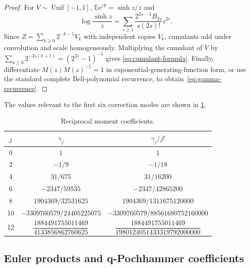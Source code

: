 \documentclass[11pt,a4paper]{article}
\theoremstyle{remark}
\newcommand{\e}{\mathrm{e}}
\begin{document}
\begin{proof}
For $V\sim\operatorname{Unif}[-1,1]$,
$\mathbb E\e^{zV}=\sinh z/z$ and
\begin{equation}
 \log\frac{\sinh z}{z}
 =\sum_{s\ge1}
 \frac{2^{2s-1}B_{2s}}{s(2s)!}z^{2s}.
 \label{eq:logsinh}
\end{equation}
Since $Z=\sum_{k\ge0}2^{-k-1}V_k$ with independent copies $V_k$, cumulants
add under convolution and scale homogeneously.  Multiplying the cumulant of
$V$ by
$\sum_{k\ge0}2^{-2s(k+1)}=(2^{2s}-1)^{-1}$ gives
\eqref{eq:cumulant-formula}.  Finally, differentiate
$M(z)M(z)^{-1}=1$ in exponential-generating-function form, or use the standard
complete Bell-polynomial recurrence, to obtain~\eqref{eq:gamma-recurrence}.
\end{proof}

The values relevant to the first six correction modes are shown in
\cref{tab:gamma-values}.

\begin{table}[htbp]
\centering
\caption{Reciprocal moment coefficients.}
\label{tab:gamma-values}
\small
\renewcommand{\arraystretch}{1.22}
\begin{tabular}{c c c}
\toprule
$j$ & $\gamma_j$ & $\gamma_j/j!$\\
\midrule
0 & $1$ & $1$\\
2 & $-1/9$ & $-1/18$\\
4 & $31/675$ & $31/16200$\\
6 & $-2347/59535$ & $-2347/42865200$\\
8 & $1904369/32531625$ & $1904369/1311675120000$\\
10 & $-3309760579/24405225075$ &
$-3309760579/88561680752160000$\\
12 & $\dfrac{1884491755011469}{4133856862760625}$ &
$\dfrac{1884491755011469}{1980124051433319792000000}$\\
\bottomrule
\end{tabular}
\end{table}

\subsection{Euler products and q-Pochhammer coefficients}
\end{document}
